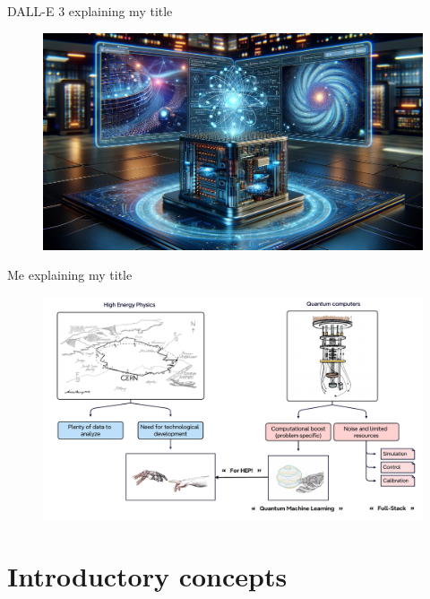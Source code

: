 \documentclass[8pt, xcolor={svgnames}, hyperref={linkcolor=black}]{beamer}
\begin{document}
\begin{frame}{DALL-E 3 explaining my title}
\begin{figure}  
    \includegraphics[width=1\textwidth]{figures/dalleplus.png}%
\end{figure}
\end{frame}

\begin{frame}{Me explaining my title}
\begin{figure}  
    \includegraphics[width=1\textwidth]{figures/fsqml4hep}
\end{figure}
\end{frame}

\section{Introductory concepts}
\end{document}
